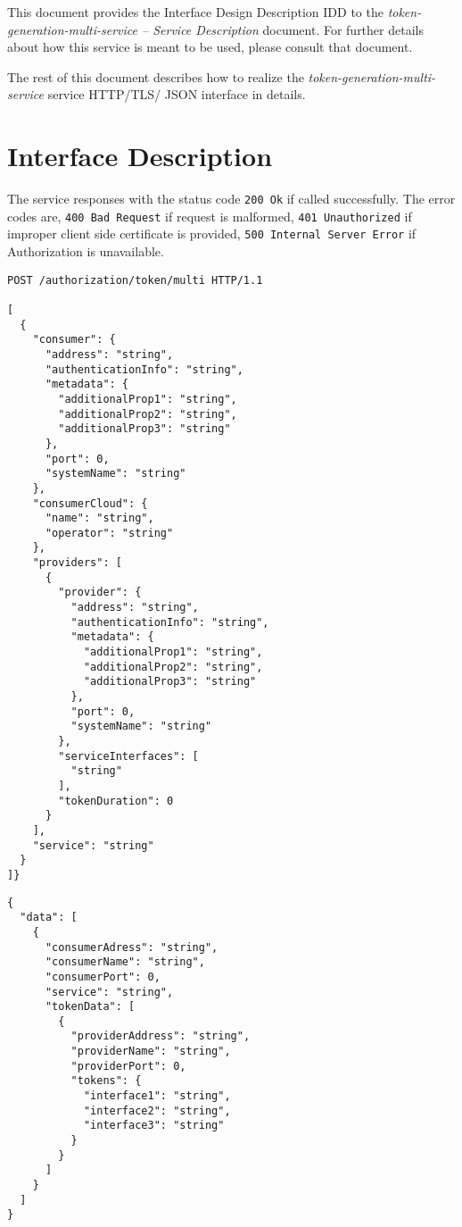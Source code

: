 \documentclass[a4paper]{arrowhead}
\newcommand{\fref}[1]{{\textcolor{ArrowheadBlue}{\hyperref[sec:functions:#1]{#1}}}}
\begin{document}
This document provides the Interface Design Description IDD to the \textit{token-generation-multi-service -- Service Description} document.
For further details about how this service is meant to be used, please consult that document.

The rest of this document describes how to realize the \textit{token-generation-multi-service} service HTTP/TLS/ JSON interface in details.

\newpage

\section{Interface Description}
\label{sec:functions}

The service responses with the status code \texttt{200 Ok} if called successfully. The error codes are, \texttt{400 Bad Request} if request is malformed, \texttt{401 Unauthorized} if improper client side certificate is provided, \texttt{500 Internal Server Error} if Authorization is unavailable.

\begin{lstlisting}[language=http,label={lst:authorization},caption={A \fref{token-generation-multi-service} invocation.}]
POST /authorization/token/multi HTTP/1.1

[
  {
    "consumer": {
      "address": "string",
      "authenticationInfo": "string",
      "metadata": {
        "additionalProp1": "string",
        "additionalProp2": "string",
        "additionalProp3": "string"
      },
      "port": 0,
      "systemName": "string"
    },
    "consumerCloud": {
      "name": "string",
      "operator": "string"
    },
    "providers": [
      {
        "provider": {
          "address": "string",
          "authenticationInfo": "string",
          "metadata": {
            "additionalProp1": "string",
            "additionalProp2": "string",
            "additionalProp3": "string"
          },
          "port": 0,
          "systemName": "string"
        },
        "serviceInterfaces": [
          "string"
        ],
        "tokenDuration": 0
      }
    ],
    "service": "string"
  }
]}

\end{lstlisting}

\clearpage

\begin{lstlisting}[language=http,label={lst:authorization},caption={A \fref{token-generation-multi-service} response.}]
{
  "data": [
    {
      "consumerAdress": "string",
      "consumerName": "string",
      "consumerPort": 0,
      "service": "string",
      "tokenData": [
        {
          "providerAddress": "string",
          "providerName": "string",
          "providerPort": 0,
          "tokens": {
            "interface1": "string",
            "interface2": "string",
            "interface3": "string"
          }
        }
      ]
    }
  ]
}
\end{lstlisting}
\end{document}
